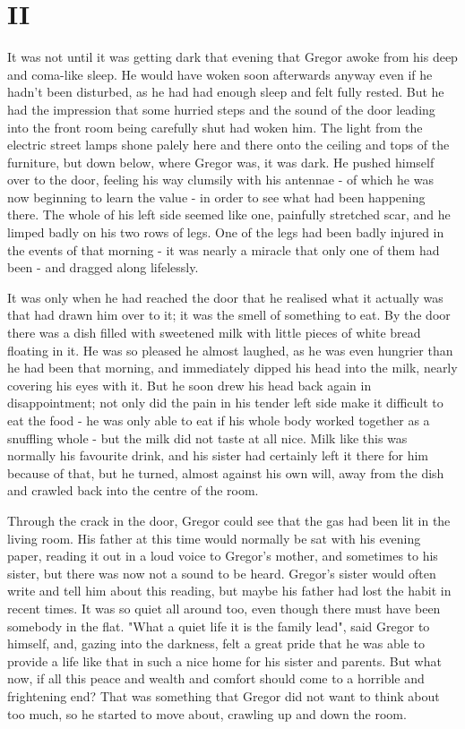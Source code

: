 \chapter{II}

It was not until it was getting dark that evening that Gregor awoke from his deep and coma-like sleep. He would have woken soon afterwards anyway even if he hadn't been disturbed, as he had had enough sleep and felt fully rested. But he had the impression that some hurried steps and the sound of the door leading into the front room being carefully shut had woken him. The light from the electric street lamps shone palely here and there onto the ceiling and tops of the furniture, but down below, where Gregor was, it was dark. He pushed himself over to the door, feeling his way clumsily with his antennae - of which he was now beginning to learn the value - in order to see what had been happening there. The whole of his left side seemed like one, painfully stretched scar, and he limped badly on his two rows of legs. One of the legs had been badly injured in the events of that morning - it was nearly a miracle that only one of them had been - and dragged along lifelessly.

It was only when he had reached the door that he realised what it actually was that had drawn him over to it; it was the smell of something to eat. By the door there was a dish filled with sweetened milk with little pieces of white bread floating in it. He was so pleased he almost laughed, as he was even hungrier than he had been that morning, and immediately dipped his head into the milk, nearly covering his eyes with it. But he soon drew his head back again in disappointment; not only did the pain in his tender left side make it difficult to eat the food - he was only able to eat if his whole body worked together as a snuffling whole - but the milk did not taste at all nice. Milk like this was normally his favourite drink, and his sister had certainly left it there for him because of that, but he turned, almost against his own will, away from the dish and crawled back into the centre of the room.

Through the crack in the door, Gregor could see that the gas had been lit in the living room. His father at this time would normally be sat with his evening paper, reading it out in a loud voice to Gregor's mother, and sometimes to his sister, but there was now not a sound to be heard. Gregor's sister would often write and tell him about this reading, but maybe his father had lost the habit in recent times. It was so quiet all around too, even though there must have been somebody in the flat. "What a quiet life it is the family lead", said Gregor to himself, and, gazing into the darkness, felt a great pride that he was able to provide a life like that in such a nice home for his sister and parents. But what now, if all this peace and wealth and comfort should come to a horrible and frightening end? That was something that Gregor did not want to think about too much, so he started to move about, crawling up and down the room.


